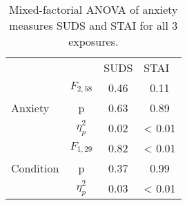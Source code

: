 \begin{table}[t!]
\caption{Mixed-factorial ANOVA of anxiety measures SUDS and STAI for all 3 exposures.}
\centering
\begin{tabular}{lccc}
                                                                 & \multicolumn{1}{l}{} & \multicolumn{1}{l}{SUDS} & \multicolumn{1}{l}{STAI} \\ \cline{2-4} 
\multicolumn{1}{l|}{\multirow{3}{*}{Anxiety}}                    & $F_{2, 58}$          & 0.46                     & 0.11                     \\
\multicolumn{1}{l|}{}                                            & p                    & 0.63                     & 0.89                     \\
\multicolumn{1}{l|}{}                                            & $\eta^2_{p}$         & 0.02                     & < 0.01                   \\ \hline
\multicolumn{1}{l|}{\multirow{3}{*}{Condition}}                  & $F_{1,29}$           & 0.82                     & < 0.01                   \\
\multicolumn{1}{l|}{}                                            & p                    & 0.37                     & 0.99                     \\
\multicolumn{1}{l|}{}                                            & $\eta^2_{p}$         & 0.03                     & < 0.01                   \\ \hline

\end{tabular}
\end{table}
